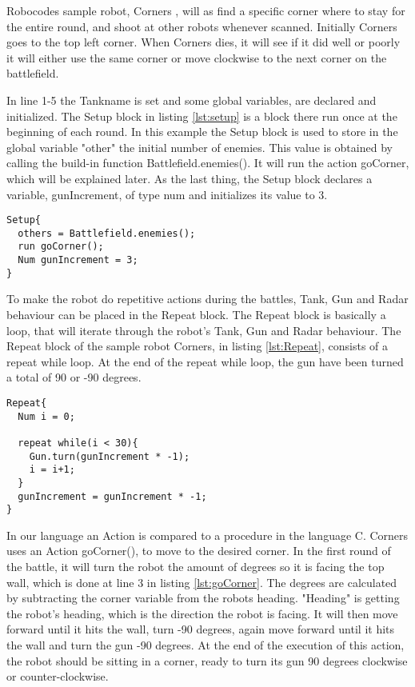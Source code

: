 Robocodes sample robot, Corners \citep{Corners}, will as find a specific corner where to stay for the entire round, and shoot at other robots whenever scanned. Initially Corners goes to the top left corner. When Corners dies, it will see if it did well or poorly it will either use the same corner or move clockwise to the next corner on the battlefield.

In line 1-5 the Tankname is set and some global variables, are declared and initialized. The Setup block in listing \ref{lst:setup} is a block there run once at the beginning of each round. In this example the Setup block is used to store in the global variable "other" the initial number of enemies. This value is obtained by calling the build-in function Battlefield.enemies(). It will run the action goCorner, which will be explained later. As the last thing, the Setup block declares a variable, gunIncrement, of type num and initializes its value to 3.

\begin{lstlisting}[caption={Code listing of the Setup block},  xleftmargin=.2\textwidth, label={lst:setup}]
Setup{
  others = Battlefield.enemies();  
  run goCorner();	 
  Num gunIncrement = 3;
}
\end{lstlisting}

To make the robot do repetitive actions during the battles, Tank, Gun and Radar behaviour can be placed in the Repeat block. The Repeat block is basically a loop, that will iterate through the robot's Tank, Gun and Radar behaviour. The Repeat block of the sample robot Corners, in listing \ref{lst:Repeat}, consists of a repeat while loop. At the end of the repeat while loop, the gun have been turned a total of 90 or -90 degrees. 

\begin{lstlisting}[caption={Code listing of the Repeat block}, xleftmargin=.2\textwidth, label={lst:Repeat}]
Repeat{  
  Num i = 0;
  
  repeat while(i < 30){
    Gun.turn(gunIncrement * -1);
    i = i+1;
  }  
  gunIncrement = gunIncrement * -1;
}
\end{lstlisting}

In our language an Action is compared to a procedure in the language C. Corners uses an Action goCorner(), to move to the desired corner. In the first round of the battle, it will turn the robot the amount of degrees so it is facing the top wall, which is done at line 3 in listing \ref{lst:goCorner}. The degrees are calculated by subtracting the corner variable from the robots heading. "Heading" is getting the robot's heading, which is the direction the robot is facing. It will then move forward until it hits the wall, turn -90 degrees, again  move forward until it hits the wall and turn the gun -90 degrees. At the end of the execution of this action, the robot should be sitting in a corner, ready to turn its gun 90 degrees clockwise or counter-clockwise.


